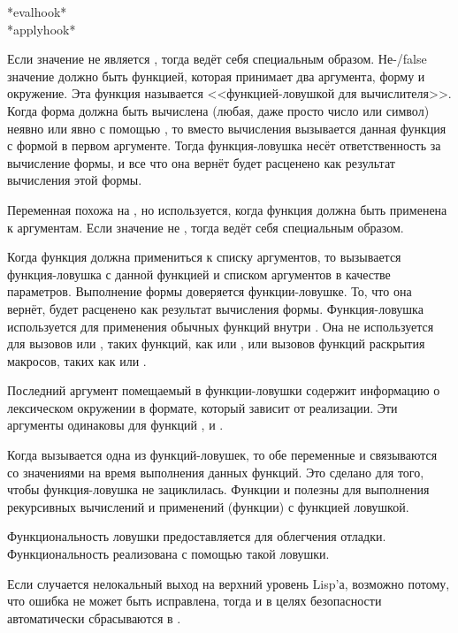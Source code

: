 \begin{defun}[Variable]
*evalhook* \\
*applyhook*

Если значение  не является {\false}, тогда  ведёт себя
специальным образом. Не-{/false} значение  должно быть функцией,
которая принимает два аргумента, форму и окружение.
Эта функция называется <<функцией-ловушкой для вычислителя>>.
Когда форма должна быть вычислена (любая, даже просто число или символ) неявно или явно с
помощью , то вместо вычисления вызывается данная функция с формой в
первом аргументе.
Тогда функция-ловушка несёт ответственность за вычисление формы, и все что она
вернёт будет расценено как результат вычисления этой формы.

Переменная  похожа на , но используется, когда
функция должна быть применена к аргументам.
Если значение  не {\false}, тогда  ведёт себя
специальным образом.

Когда функция должна примениться к списку аргументов, то вызывается
функция-ловушка с данной функцией и списком аргументов в качестве параметров.
Выполнение формы доверяется функции-ловушке. То, что она вернёт, будет расценено
как результат вычисления формы.
Функция-ловушка используется для применения обычных функций внутри
. Она не используется для вызовов  или
, таких функций, как  или , или
вызовов функций раскрытия макросов, таких как  или .

Последний аргумент помещаемый в функции-ловушки содержит информацию о
лексическом окружении в формате, который зависит от реализации.
Эти аргументы одинаковы для функций ,  и
.

Когда вызывается одна из функций-ловушек, то обе переменные  и
 связываются со значениями {\nil} на время выполнения данных
функций. Это сделано для того, чтобы функция-ловушка не зациклилась.
Функции  и  полезны для выполнения рекурсивных
вычислений и применений (функции) с функцией ловушкой.

Функциональность ловушки предоставляется для облегчения отладки.
Функциональность  реализована с помощью такой ловушки.

Если случается нелокальный выход на верхний уровень Lisp'а, возможно потому, что
ошибка не может быть исправлена, тогда  и 
в целях безопасности автоматически сбрасываются в {\false}.
\end{defun}

